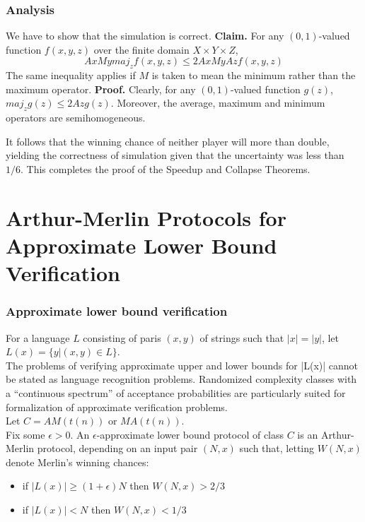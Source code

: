 \documentclass{beamer}
\begin{document}
\begin{frame}
\frametitle{Analysis}
We have to show that the simulation is correct.
\textbf{Claim.} For any $(0, 1)$-valued function $f(x, y, z)$ over the finite domain $X \times Y \times Z$, $$AxMy maj_z f(x, y, z) \leq 2 A x M y A z f(x,y,z)$$
The same inequality applies if $M$ is taken to mean the minimum rather than the maximum operator.
\textbf{Proof.} Clearly, for any $(0,1)$-valued function $g(z)$, $maj_z g(z) \leq 2 A z g(z)$. Moreover, the average, maximum and minimum operators are semihomogeneous.

It follows that the winning chance of neither player will more than double, yielding the correctness of simulation given that the uncertainty was less than $1/6$. This completes the proof of the Speedup and Collapse Theorems.
\end{frame}



\section{Arthur-Merlin Protocols for Approximate Lower Bound Verification}

\begin{frame}
\frametitle{Approximate lower bound verification}
For a language $L$ consisting of paris $(x, y)$ of strings such that $|x| = |y|$, let $L(x) = \{ y | (x, y) \in L \}$.\\
The problems of verifying approximate upper and lower bounds for |L(x)| cannot be stated as language recognition problems. Randomized complexity classes with a ``continuous spectrum'' of acceptance probabilities are particularly suited for formalization of approximate verification problems.\\
Let $C = AM(t(n))$ or $MA(t(n))$.\\
Fix some $\epsilon > 0$. An $\epsilon$-approximate lower bound protocol of class $C$ is an Arthur-Merlin protocol, depending on an input pair $(N, x)$ such that, letting $W(N, x)$ denote Merlin's winning chances:
\begin{itemize}
	\item if $|L(x)| \geq (1 + \epsilon) N$ then $W(N, x) > 2/3$
	\item if $|L(x)| < N$ then $W(N, x) < 1/3$
\end{itemize}
\end{frame}
\end{document}
